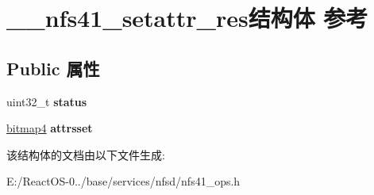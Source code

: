 \hypertarget{struct____nfs41__setattr__res}{}\section{\+\_\+\+\_\+nfs41\+\_\+setattr\+\_\+res结构体 参考}
\label{struct____nfs41__setattr__res}
\subsection*{Public 属性}
\begin{DoxyCompactItemize}
\item 
\mbox{\label{struct____nfs41__setattr__res_abb02758bc052695329290961695c40f3}} 
uint32\+\_\+t {\bfseries status}
\item 
\mbox{\label{struct____nfs41__setattr__res_a25bf215f01c4f8196865f288f66e63be}} 
\hyperlink{struct____bitmap4}{bitmap4} {\bfseries attrsset}
\end{DoxyCompactItemize}


该结构体的文档由以下文件生成\+:\begin{DoxyCompactItemize}
\item 
E\+:/\+React\+O\+S-\/0../base/services/nfsd/nfs41\+\_\+ops.\+h\end{DoxyCompactItemize}
